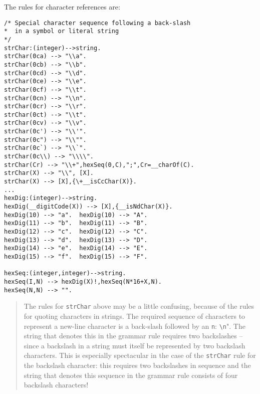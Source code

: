 The rules for character references are:
\begin{verbatim}
/* Special character sequence following a back-slash
*  in a symbol or literal string
*/
strChar:(integer)-->string.
strChar(0ca) --> "\\a".
strChar(0cb) --> "\\b".
strChar(0cd) --> "\\d".
strChar(0ce) --> "\\e".
strChar(0cf) --> "\\t".
strChar(0cn) --> "\\n".
strChar(0cr) --> "\\r".
strChar(0ct) --> "\\t".
strChar(0cv) --> "\\v".
strChar(0c') --> "\\'".
strChar(0c") --> "\\"".
strChar(0c`) --> "\\`".
strChar(0c\\) --> "\\\\".
strChar(Cr) --> "\\+",hexSeq(0,C),";",Cr=__charOf(C).
strChar(X) --> "\\", [X].
strChar(X) --> [X],{\+__isCcChar(X)}.
...
hexDig:(integer)-->string.
hexDig(__digitCode(X)) --> [X],{__isNdChar(X)}.
hexDig(10) --> "a".  hexDig(10) --> "A".
hexDig(11) --> "b".  hexDig(11) --> "B".
hexDig(12) --> "c".  hexDig(12) --> "C".
hexDig(13) --> "d".  hexDig(13) --> "D".
hexDig(14) --> "e".  hexDig(14) --> "E".
hexDig(15) --> "f".  hexDig(15) --> "F".

hexSeq:(integer,integer)-->string.
hexSeq(I,N) --> hexDig(X)!,hexSeq(N*16+X,N).
hexSeq(N,N) --> "".
\end{verbatim}
\begin{quote}
The rules for \verb+strChar+ above may be a little confusing, because of the rules for quoting characters in strings. The required sequence of characters to represent a new-line character is a back-slash followed by an \verb+n+: \verb+\n+". The string that denotes this in the grammar rule requires two backslashes -- since a backslash in a string must itself be represented by two backslash characters. This is especially spectacular in the case of the \verb+strChar+ rule for the backslash character: this requires two backslashes in sequence and the string that denotes this sequence in the grammar rule consists of four backslash characters!
\end{quote}

